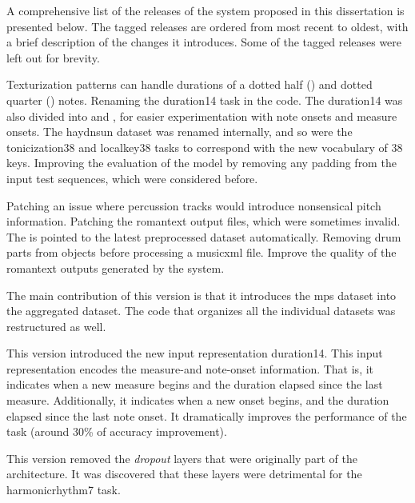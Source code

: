 A comprehensive list of the releases of the system proposed
in this dissertation is presented below. The tagged releases
are ordered from most recent to oldest, with a brief
description of the changes it introduces. Some of the tagged
releases were left out for brevity.

Texturization patterns can handle durations of a dotted half
(\musHalfDotted) and dotted quarter (\musQuarterDotted)
notes. Renaming the \gls{duration14} task in the code. The
\gls{duration14} was also divided into 
and , for easier experimentation with note
onsets and measure onsets. The \gls{haydnsun} dataset was
renamed internally, and so were the \gls{tonicization38} and
\gls{localkey38} tasks to correspond with the new vocabulary
of 38 keys. Improving the evaluation of the model by
removing any padding from the input test sequences, which
were considered before.

Patching an issue where percussion tracks would introduce
nonsensical pitch information. Patching the \gls{romantext}
output files, which were sometimes invalid. The
 is pointed to the latest preprocessed dataset
automatically. Removing drum parts from
 objects before processing a
\gls{musicxml} file. Improve the quality of the
\gls{romantext} outputs generated by the system.

The main contribution of this version is that it introduces
the \gls{mps} dataset into the aggregated dataset. The code
that organizes all the individual datasets was restructured
as well. 

This version introduced the new input representation
\gls{duration14}. This input representation encodes the
measure-and note-onset information. That is, it indicates
when a new measure begins and the duration elapsed since the
last measure. Additionally, it indicates when a new onset
begins, and the duration elapsed since the last note onset.
It dramatically improves the performance of the
 task (around 30\% of accuracy
improvement).

This version removed the \emph{dropout} layers
\parencite{dahl2013improving} that were originally part of
the architecture. It was discovered that these layers were
detrimental for the \gls{harmonicrhythm7} task.

